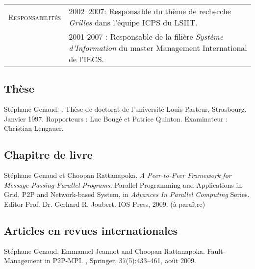 \begin{tabular}{lp{13.7cm}}
\textsc{Responsabilités} & 2002--2007: Responsable du thème de recherche \textit{Grilles} dans l'équipe ICPS du LSIIT.\\[2mm]
				 & 2001-2007 : Responsable de la filière \textit{Système d'Information} du master Management International de l'IECS.\\[2mm]
\end{tabular}



\newpage
\small

\begin{thebibliography}{99}

\subsection*{Th\`{e}se}

St\'{e}phane Genaud.
.
\newblock Thèse de doctorat de l'universit\'{e} Louis Pasteur, Strasbourg, Janvier 1997.
\newblock Rapporteurs : Luc Bougé et Patrice Quinton. Examinateur : Christian Lengauer.

\subsection*{Chapitre de livre}

St\'{e}phane Genaud et Choopan Rattanapoka.
\newblock \emph{A Peer-to-Peer Framework for Message Passing Parallel Programs.}
\newblock Parallel Programming and Applications in Grid, P2P and Network-based System,
in {\em Advances In Parallel Computing} Series. Editor Prof. Dr. Gerhard R. Joubert.
IOS Press, 2009. (à paraître)
 

\subsection*{Articles en revues internationales}

\setlength{\itemsep}{1.5mm}


\newblock Stéphane Genaud, Emmanuel Jeannot and Choopan Rattanapoka.
\newblock Fault-Management in P2P-MPI.
, Springer, 37(5):433--461, août 2009.



\end{thebibliography}
